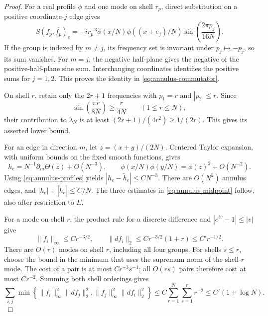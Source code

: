 \begin{proof}
For a real profile $\phi$ and one mode on shell $r_p$, direct substitution
on a positive coordinate-$j$ edge gives
\begin{equation}\label{eq:annulus-one-mode}
 S(f_p,\overline{f_p})_e
 =-i r_p^{-3}\phi(x/N)\phi((x+e_j)/N)
       \sin\left(\frac{2\pi p_j}{16N}\right).
\end{equation}
If the group is indexed by $m\ne j$, its frequency set is invariant
under $p_j\mapsto-p_j$, so its sum vanishes.  For $m=j$, the negative
half-plane gives the negative of the positive-half-plane sine sum.
Interchanging coordinates identifies the positive sums for $j=1,2$.
This proves the identity in \eqref{eq:annulus-commutator}.

On shell $r$, retain only the $2r+1$ frequencies with $p_1=r$ and
$|p_2|\leq r$.  Since
\[
 \sin\left(\frac{\pi r}{8N}\right)\geq\frac r{4N}
 \qquad(1\leq r\leq N),
\]
their contribution to $\lambda_N$ is at least
$(2r+1)/(4r^2)\geq1/(2r)$.  This gives its asserted lower bound.

For an edge in direction $m$, let $z=(x+y)/(2N)$.  Centered Taylor
expansion, with uniform bounds on the fixed smooth functions, gives
\[
 h_e=N^{-1}\partial_m\Theta(z)+O(N^{-3}),\qquad
 \phi(x/N)\phi(y/N)=\phi(z)^2+O(N^{-2}).
\]
Using \eqref{eq:annulus-profiles} yields
$|h_e-\widetilde h_e|\leq C N^{-3}$.  There are $O(N^2)$ annulus
edges, and $|h_e|+|\widetilde h_e|\leq C/N$.  The three estimates in
\eqref{eq:annulus-midpoint} follow, also after restriction to $E$.

For a mode on shell $r$, the product rule for a discrete difference
and $|e^{iv}-1|\leq|v|$ give
\begin{equation}\label{eq:annulus-mode-norms}
 \|f_i\|_\infty\leq Cr^{-3/2},\qquad
 \|df_i\|_2\leq Cr^{-3/2}(1+r)\leq C' r^{-1/2}.
\end{equation}
There are $O(r)$ modes on shell $r$, including all four groups.
For shells $s\leq r$, choose the bound in the minimum that uses the
supremum norm of the shell-$r$ mode.  The cost of a pair is at most
$Cr^{-3}s^{-1}$; all $O(rs)$ pairs therefore cost at most $Cr^{-2}$.
Summing both shell orderings gives
\begin{equation}\label{eq:annulus-minimum-sum}
 \sum_{i,j}\min\left\{
   \|f_i\|_\infty^2\|df_j\|_2^2,
   \|f_j\|_\infty^2\|df_i\|_2^2
 \right\}
 \leq C\sum_{r=1}^N\sum_{s=1}^r r^{-2}
 \leq C'(1+\log N).
\end{equation}


\end{proof}
